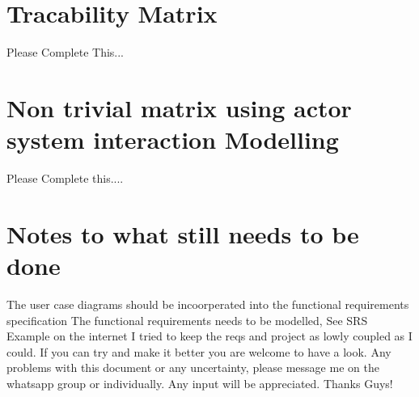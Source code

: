 \documentclass{article}
\begin{document}
\section{Tracability Matrix}
 
Please Complete This...

\newpage
\centering
\section{Non trivial matrix using actor system interaction Modelling}
 
Please Complete this....

\section{Notes to what still needs to be done}
The user case diagrams should be incoorperated into the functional requirements specification
The functional requirements needs to be modelled, See SRS Example on the internet 
I tried to keep the reqs and project as lowly coupled as I could. If you can try and make it better you are welcome to have a look.
Any problems with this document or any uncertainty, please message me on the whatsapp group or individually.
Any input will be appreciated.
Thanks Guys!
\end{document}
